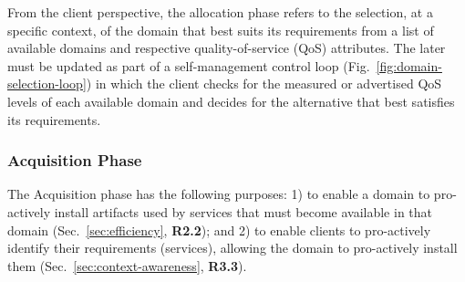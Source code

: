

From the client perspective, the allocation phase refers to the selection, at a specific context, of the domain that best suits its requirements from a list of available domains and respective quality-of-service (QoS) attributes. The later must be updated as part of a self-management control loop (Fig.~\ref{fig:domain-selection-loop}) in which the client checks for the measured or advertised QoS levels of each available domain and decides for the alternative that best satisfies its requirements. 



\subsubsection*{Acquisition Phase}\label{sec:A3-E-acquisition}

The Acquisition phase has the following purposes: 1) to enable a domain to pro-actively install artifacts used by services that must become available in that domain (Sec.~\ref{sec:efficiency}, \textbf{R2.2}); and 2) to enable clients to pro-actively identify their requirements (services), allowing the domain to pro-actively install them (Sec.~\ref{sec:context-awareness}, \textbf{R3.3}). 


